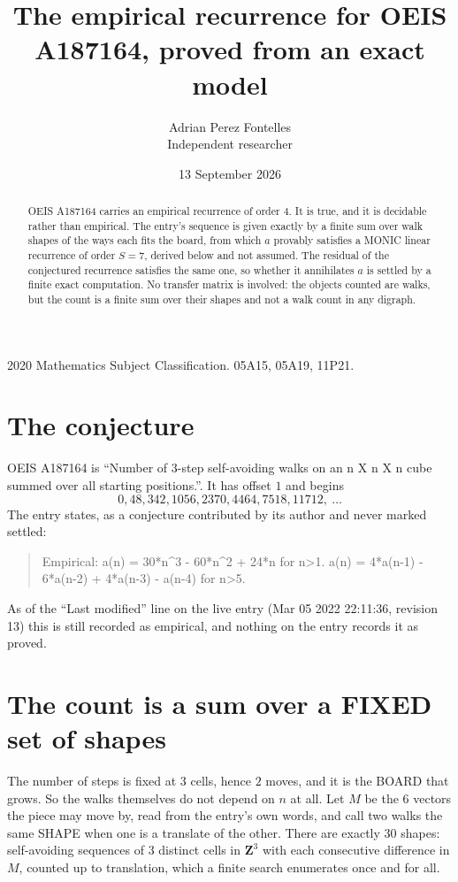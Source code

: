 \documentclass[11pt,a4paper]{article}
\title{The empirical recurrence for OEIS A187164, proved from an exact model}
\author{Adrian Perez Fontelles\\ \small Independent researcher}
\date{13 September 2026}
\theoremstyle{plain}
\theoremstyle{definition}
\begin{document}
\maketitle

\begin{abstract}
OEIS A187164 carries an empirical recurrence of order $4$. It is true, and it is
decidable rather than empirical. The entry's sequence is given exactly by a finite sum over walk shapes of the ways each fits the board, from
which $a$ provably satisfies a MONIC linear recurrence of order $S=7$, derived below and not
assumed. The residual of the conjectured recurrence satisfies the same one, so whether it
annihilates $a$ is settled by a finite exact computation. No transfer matrix is involved: the objects counted are walks, but the count is a finite sum over their shapes and not a walk count in any digraph.
\end{abstract}

\noindent\small 2020 Mathematics Subject Classification. 05A15, 05A19, 11P21.\normalsize

\section{The conjecture}

OEIS A187164 is ``Number of 3-step self-avoiding walks on an n X n X n cube summed over all starting positions.''. It has offset $1$ and begins
\[
0, 48, 342, 1056, 2370, 4464, 7518, 11712,\ \dots
\]
The entry states, as a conjecture contributed by its author and never marked settled:
\begin{quote}
Empirical: a(n) = 30*n\^{}3 - 60*n\^{}2 + 24*n for n>1. a(n) = 4*a(n-1) - 6*a(n-2) + 4*a(n-3) - a(n-4) for n>5.
\end{quote}
As of the ``Last modified'' line on the live entry (Mar 05 2022 22:11:36, revision 13)
this is still recorded as empirical, and nothing on the entry records it as proved.

\section{The count is a sum over a FIXED set of shapes}

The number of steps is fixed at $3$ cells, hence $2$ moves, and it is the BOARD
that grows. So the walks themselves do not depend on $n$ at all. Let $M$ be the $6$
vectors the piece may move by, read from the entry's own words, and call two walks the same
SHAPE when one is a translate of the other. There are exactly $30$ shapes: self-avoiding
sequences of $3$ distinct cells in $\mathbf{Z}^{3}$ with each consecutive difference in
$M$, counted up to translation, which a finite search enumerates once and for all.
\end{document}
